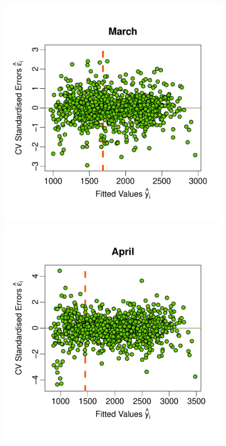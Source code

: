 \documentclass[a4paper, 12pt]{article}
\begin{document}
\begin{figure}
 \includegraphics[width=\scale]{Emulator_CV/ScatterPlots/March_CV_Scatter}\\[-3ex]
 \includegraphics[width=\scale]{Emulator_CV/ScatterPlots/April_CV_Scatter}\hspace{-1ex}

\end{figure}
\end{document}
